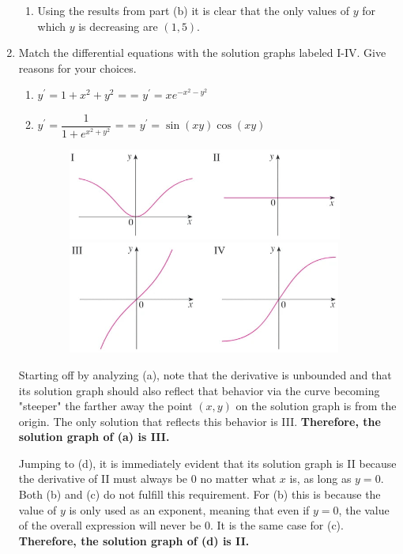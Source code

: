 \documentclass{article}
\makeatletter
\newcommand{\inlineitem}[1][]{%
\ifnum\enit@type=\tw@
    {\descriptionlabel{#1}}
  \hspace{\labelsep}%
\else
  \ifnum\enit@type=\z@
       \refstepcounter{\@listctr}\fi
    \quad\@itemlabel\hspace{\labelsep}%
\fi}
\makeatother
\begin{document}
\begin{enumerate}[label=\textbf{\arabic*.}]
\begin{enumerate}[label = (\alph*)]
\item Using the results from part (b) it is clear that the only values of $y$ for which $y$ is decreasing are $(1,5)$.
\end{enumerate}

\newpage


\item Match the differential equations with the solution graphs labeled I-IV. Give reasons for your choices. 
\begin{enumerate}[label  = (\alph*)]
\item $y^\prime = 1+x^2+y^2$ \qquad\qquad\qquad \inlineitem $y^\prime = xe^{-x^2-y^2}$    \item $y^\prime = \dfrac{1}{1+e^{x^2+y^2}}$ \qquad\qquad\qquad \inlineitem $y^\prime = \sin(xy)\cos(xy)$
\begin{figure}[H]
\centering
\includegraphics{iii}\\
\includegraphics{iiiiv}
\end{figure}
\end{enumerate}

\bigskip

Starting off by analyzing (a), note that the derivative is unbounded and that its solution graph should also reflect that behavior via the curve becoming "steeper" the farther away the point $(x,y)$ on the solution graph is from the origin. The only solution that reflects this behavior is III. \textbf{Therefore, the solution graph of (a) is III.}


Jumping to (d), it is immediately evident that its solution graph is II because the derivative of II must always be 0 no matter what $x$ is, as long as $y=0$. Both (b) and (c) do not fulfill this requirement. For (b) this is because the value of $y$ is only used as an exponent, meaning that even if $y=0$, the value of the overall expression will never be 0. It is the same case for (c). \textbf{Therefore, the solution graph of (d) is II.}


\end{enumerate}
\end{document}

